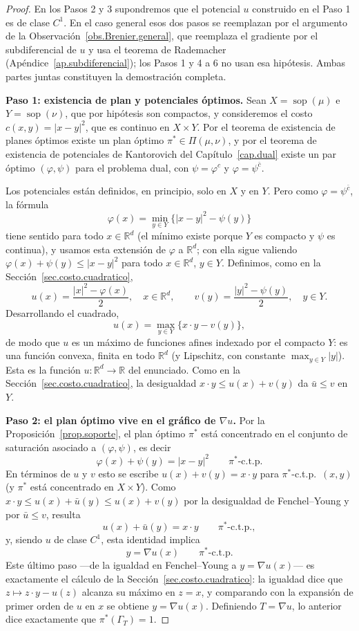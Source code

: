 \documentclass[12pt, a4paper]{amsbook}
\def\sop{\operatorname {\mathrm{sop}}}
\newcommand{\R}{{\mathbb R}}
\theoremstyle{remark}
\theoremstyle{definition}
\numberwithin{section}{chapter}
\numberwithin{subsection}{section}
\numberwithin{equation}{section}
\numberwithin{figure}{chapter}
\begin{document}
\begin{proof}
En los Pasos 2 y 3 supondremos que el potencial $u$ construido en el Paso 1
es de clase $C^1$. En el caso general esos dos pasos se reemplazan por el
argumento de la Observación~\ref{obs.Brenier.general}, que reemplaza el
gradiente por el subdiferencial de $u$ y usa el teorema de Rademacher
(Apéndice~\ref{ap.subdiferencial}); los Pasos 1 y 4 a 6 no usan esa
hipótesis. Ambas partes juntas constituyen la demostración completa.

\medskip
\textbf{Paso 1: existencia de plan y potenciales óptimos.}
Sean $X=\sop(\mu)$ e $Y=\sop(\nu)$, que por hipótesis son compactos, y
consideremos el costo $c(x,y)=|x-y|^2$, que es continuo en $X\times Y$. Por el
teorema de existencia de planes óptimos existe un plan óptimo
$\pi^*\in\Pi(\mu,\nu)$, y por el teorema de existencia de potenciales de
Kantorovich del Capítulo~\ref{cap.dual} existe un par óptimo
$(\varphi,\psi)$ para el problema dual, con $\psi=\varphi^c$ y
$\varphi=\psi^{\bar c}$.

Los potenciales están definidos, en principio, solo en $X$ y en $Y$. Pero
como $\varphi=\psi^{\bar c}$, la fórmula
\[
\varphi(x)=\min_{y\in Y}\bigl\{|x-y|^2-\psi(y)\bigr\}
\]
tiene sentido para todo $x\in\R^d$ (el mínimo existe porque $Y$ es compacto
y $\psi$ es continua), y usamos esta extensión de $\varphi$ a $\R^d$; con ella
sigue valiendo $\varphi(x)+\psi(y)\le|x-y|^2$ para todo $x\in\R^d$, $y\in Y$.
Definimos, como en la Sección~\ref{sec.costo.cuadratico},
\[
u(x)=\frac{|x|^2-\varphi(x)}{2},\quad x\in\R^d,
\qquad
v(y)=\frac{|y|^2-\psi(y)}{2},\quad y\in Y.
\]
Desarrollando el cuadrado,
\[
u(x)=\max_{y\in Y}\bigl\{x\cdot y-v(y)\bigr\},
\]
de modo que $u$ es un máximo de funciones afines indexado por el compacto $Y$:
es una función convexa, finita en todo $\R^d$ (y Lipschitz, con constante
$\max_{y\in Y}|y|$). Esta es la función $u\colon\R^d\to\R$ del enunciado.
Como en la Sección~\ref{sec.costo.cuadratico}, la desigualdad
$x\cdot y\le u(x)+v(y)$ da $\bar u\le v$ en $Y$.

\medskip
\textbf{Paso 2: el plan óptimo vive en el gráfico de $\nabla u$.}
Por la Proposición~\ref{prop.soporte}, el plan óptimo $\pi^*$ está concentrado
en el conjunto de saturación asociado a $(\varphi,\psi)$, es decir
\[
\varphi(x)+\psi(y)=|x-y|^2
\qquad
\pi^*\text{-c.t.p.}
\]
En términos de $u$ y $v$ esto se escribe $u(x)+v(y)=x\cdot y$ para
$\pi^*$-c.t.p.\ $(x,y)$ (y $\pi^*$ está concentrado en $X\times Y$). Como
$x\cdot y\le u(x)+\bar u(y)\le u(x)+v(y)$ por la desigualdad de
Fenchel--Young y por $\bar u\le v$, resulta
\[
u(x)+\bar u(y)=x\cdot y
\qquad
\pi^*\text{-c.t.p.},
\]
y, siendo $u$ de clase $C^1$, esta identidad implica
\[
y=\nabla u(x)
\qquad
\pi^*\text{-c.t.p.}
\]
Este último paso —de la igualdad en Fenchel--Young a $y=\nabla u(x)$— es
exactamente el cálculo de la Sección~\ref{sec.costo.cuadratico}: la igualdad
dice que $z\mapsto z\cdot y-u(z)$ alcanza su máximo en $z=x$, y comparando
con la expansión de primer orden de $u$ en $x$ se obtiene $y=\nabla u(x)$.
Definiendo $T=\nabla u$, lo anterior dice exactamente que
$\pi^*(\Gamma_T)=1$.


\end{proof}
\end{document}
